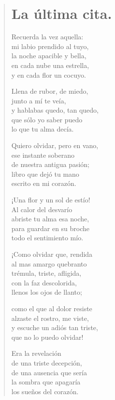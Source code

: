\documentclass[12pt, twoside]{book}
\begin{document}
\newpage
\begin{verse}
\begin{center}
\section{La última cita.}
\end{center}
Recuerda la vez aquella:\\
mi labio prendido al tuyo,\\
la noche apacible y bella,\\
en cada nube una estrella,\\
y en cada flor un cocuyo.
\newline

Llena de rubor, de miedo,\\
junto a mí te veía,\\
y hablabas quedo, tan quedo,\\
que sólo yo saber puedo\\
lo que tu alma decía.
\newline

Quiero olvidar, pero en vano,\\
ese instante soberano\\
de nuestra antigua pasión;\\
libro que dejó tu mano\\
escrito en mi corazón.
\newline

¡Una flor y un sol de estío!\\
Al calor del desvarío\\
abriste tu alma esa noche,\\
para guardar en su broche\\
todo el sentimiento mío.
\newline

¡Como olvidar que, rendida\\
al mas amargo quebranto\\
trémula, triste, afligida,\\
con la faz descolorida,\\
llenos los ojos de llanto;
\newpage

como el que al dolor resiste\\
alzaste el rostro, me viste,\\
y escuche un adiós tan triste,\\
que no lo puedo olvidar!
\newline

Era la revelación\\
de una triste decepción,\\
de una ausencia que sería\\
la sombra que apagaría\\
los sueños del corazón.
\newline


\end{verse}
\end{document}
